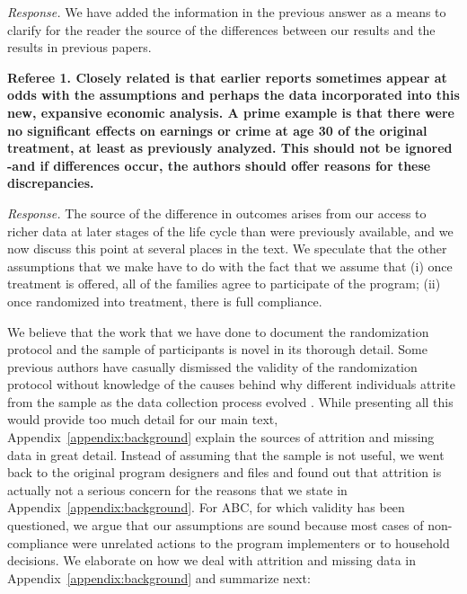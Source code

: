 \noindent \textit{Response.} We have added the information in the previous answer as a means to clarify for the reader the source of the differences between our results and the results in previous papers.

\noindent \textbf{Referee 1. Closely related is that earlier reports sometimes appear at odds with the assumptions and perhaps the data incorporated into this new, expansive economic analysis. A prime example is that there were no significant effects on earnings or crime at age 30 of the original treatment, at least as previously analyzed. This should not be ignored -and if differences occur, the authors should offer reasons for these discrepancies.}

\noindent \textit{Response.} The source of the difference in outcomes arises from our access to richer data at later stages of the life cycle than were previously available, and we now discuss this point at several places in the text. We speculate that the other assumptions that we make have to do with the fact that we assume that (i) once treatment is offered, all of the families agree to participate of the program; (ii) once randomized into treatment, there is full compliance.

\noindent We believe that the work that we have done to document the randomization protocol and the sample of participants is novel in its thorough detail. Some previous authors have casually dismissed the validity of the randomization protocol without knowledge of the causes behind why different individuals attrite from the sample as the data collection process evolved \citep[e.g.][]{Whitehurst_2014_Senate_Testimony}. While presenting all this would provide too much detail for our main text, Appendix~\ref{appendix:background} explain the sources of attrition and missing data in great detail. Instead of assuming that the sample is not useful, we went back to the original program designers and files and found out that attrition is actually not a serious concern for the reasons that we state in Appendix~\ref{appendix:background}. For ABC, for which validity has been questioned, we argue that our assumptions are sound because most cases of non-compliance were unrelated actions to the program implementers or to household decisions. We elaborate on how we deal with attrition and missing data in Appendix~\ref{appendix:background}  and summarize next:

